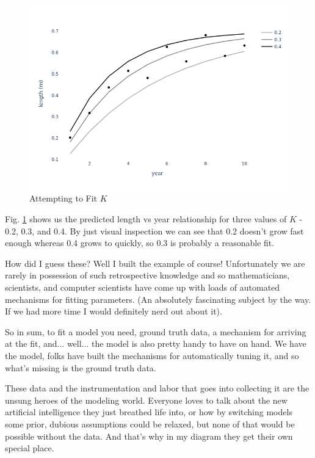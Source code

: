 \documentclass[11pt,a5paper]{book}
\begin{document}
\begin{figure}[h!] 
  \includegraphics[width=\linewidth]{notebooks/Fitting/fit_lines.png}
  \caption{Attempting to Fit $K$}
  \label{fig:fitting_K}
\end{figure}

Fig. \ref{fig:fitting_K} shows us the predicted length vs year relationship for three values of $K$ - 0.2, 0.3, and 0.4. By just visual inspection we can see that 0.2 doesn't grow fast enough whereas 0.4 grows to quickly, so 0.3 is probably a reasonable fit.
\newline

How did I guess these? Well I built the example of course! Unfortunately we are rarely in possession of such retrospective knowledge and so mathematicians, scientists, and computer scientists have come up with loads of automated mechanisms for fitting parameters. (An absolutely fascinating subject by the way. If we had more time I would definitely nerd out about it). 
\newline

So in sum, to fit a model you need, ground truth data, a mechanism for arriving at the fit, and... well... the model is also pretty handy to have on hand. We have the model, folks have built the mechanisms for automatically tuning it, and so what's missing is the ground truth data. 
\newline

These data and the instrumentation and labor that goes into collecting it are the unsung heroes of the modeling world. Everyone loves to talk about the new artificial intelligence they just breathed life into, or how by switching models some prior, dubious assumptions could be relaxed, but none of that would be possible without the data. And that's why in my diagram they get their own special place.
\newpage
\end{document}
